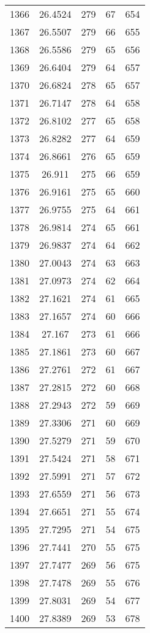 \documentclass[12pt,a4paper]{article}
\begin{document}
\begin{tabular}{r|cccc}
	1366 & 26.4524 & 279 & 67 & 654 \\
	1367 & 26.5507 & 279 & 66 & 655 \\
	1368 & 26.5586 & 279 & 65 & 656 \\
	1369 & 26.6404 & 279 & 64 & 657 \\
	1370 & 26.6824 & 278 & 65 & 657 \\
	1371 & 26.7147 & 278 & 64 & 658 \\
	1372 & 26.8102 & 277 & 65 & 658 \\
	1373 & 26.8282 & 277 & 64 & 659 \\
	1374 & 26.8661 & 276 & 65 & 659 \\
	1375 & 26.911 & 275 & 66 & 659 \\
	1376 & 26.9161 & 275 & 65 & 660 \\
	1377 & 26.9755 & 275 & 64 & 661 \\
	1378 & 26.9814 & 274 & 65 & 661 \\
	1379 & 26.9837 & 274 & 64 & 662 \\
	1380 & 27.0043 & 274 & 63 & 663 \\
	1381 & 27.0973 & 274 & 62 & 664 \\
	1382 & 27.1621 & 274 & 61 & 665 \\
	1383 & 27.1657 & 274 & 60 & 666 \\
	1384 & 27.167 & 273 & 61 & 666 \\
	1385 & 27.1861 & 273 & 60 & 667 \\
	1386 & 27.2761 & 272 & 61 & 667 \\
	1387 & 27.2815 & 272 & 60 & 668 \\
	1388 & 27.2943 & 272 & 59 & 669 \\
	1389 & 27.3306 & 271 & 60 & 669 \\
	1390 & 27.5279 & 271 & 59 & 670 \\
	1391 & 27.5424 & 271 & 58 & 671 \\
	1392 & 27.5991 & 271 & 57 & 672 \\
	1393 & 27.6559 & 271 & 56 & 673 \\
	1394 & 27.6651 & 271 & 55 & 674 \\
	1395 & 27.7295 & 271 & 54 & 675 \\
	1396 & 27.7441 & 270 & 55 & 675 \\
	1397 & 27.7477 & 269 & 56 & 675 \\
	1398 & 27.7478 & 269 & 55 & 676 \\
	1399 & 27.8031 & 269 & 54 & 677 \\
	1400 & 27.8389 & 269 & 53 & 678 \\

\end{tabular}
\end{document}
